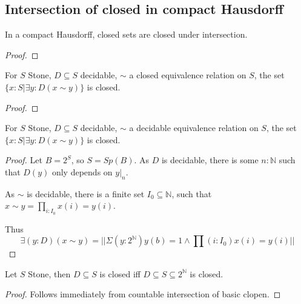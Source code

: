 \subsection{Intersection of closed in compact Hausdorff}
\begin{lemma}
  In a compact Hausdorff, closed sets are closed under intersection. 
\end{lemma}
\begin{proof}
  
\end{proof}
\begin{lemma}
  For $S$ Stone, $D\subseteq S$ decidable, $\sim$ a closed equivalence relation on $S$,
  the set $\{x:S | \exists y : D (x\sim y)\}$ is closed. 
\end{lemma}
\begin{proof}
  
\end{proof}



\begin{lemma}
  For $S$ Stone, $D\subseteq S$ decidable, 
  $\sim$ a decidable equivalence relation on $S$,
  the set $\{x:S | \exists y : D (x\sim y)\}$ is closed. 
\end{lemma}
\begin{proof}
  Let $B = 2^S$, so $S = Sp(B)$. 
  As $D$ is decidable, 
  there is some $n:\mathbb N$ such that $D(y)$ only depends on $y|_n$. 

  As $\sim$ is decidable, there is a finite set $I_0\subseteq \mathbb N$,
  such that $x\sim y = \prod_{i:I_0} x(i) = y(i)$. 

  Thus 
  $$
   \exists (y : D) (x\sim y) = 
  || \Sigma(y:2^\mathbb N) y(b) = 1 \wedge \prod(i:I_0) x(i) = y(i)||
  $$
\end{proof}



\begin{lemma}
  Let $S$ Stone, then $D\subseteq S$ is closed iff 
  $D\subseteq S\subseteq 2^{\mathbb N}$ is closed. 
\end{lemma}
\begin{proof}
  Follows immediately from countable intersection of basic clopen. 
\end{proof}




